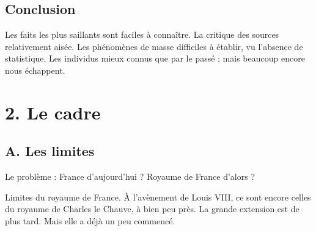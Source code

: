 \documentclass[french,twoside]{book} %
\newcommand\chapteropen{} %
\newcommand\chaptercont{} %
\newcommand\chapterclose{} %
\renewcommand\chapteropen{} %
\renewcommand\chaptercont{} %
\renewcommand\chapterclose{} %
\begin{document}
\section[Conclusion]{Conclusion}
\noindent Les faits les plus saillants sont faciles à connaître. La critique des sources relativement aisée. Les phénomènes de masse difficiles à établir, vu l’absence de statistique. Les individus mieux connus que par le passé ; mais beaucoup encore nous échappent.
\chapterclose


\chapteropen
\chapter[2. Le cadre]{\textsc{2. }Le cadre}
\label{c02}

\chaptercont
\section[A. Les limites]{A. Les limites}
\label{c02a}
\noindent  {}
\label{p7} Le problème : France d’aujourd’hui ? Royaume de France d’alors ?\par
Limites du royaume de France. À l’avènement de Louis VIII, ce sont encore celles du royaume de Charles le Chauve, à bien peu près. La grande extension est de plus tard. Mais elle a déjà un peu commencé.\par
\end{document}

